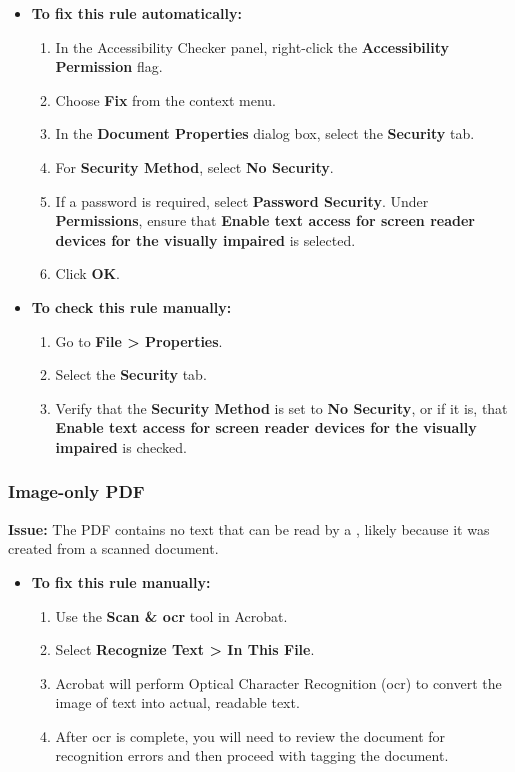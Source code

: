 \begin{itemize}
	\item \textbf{To fix this rule automatically:}
	      \begin{enumerate}
		      \item In the Accessibility Checker panel, right-click the \textbf{Accessibility Permission} flag.
		      \item Choose \textbf{Fix} from the context menu.
		      \item In the \textbf{Document Properties} dialog box, select the \textbf{Security} tab.
		      \item For \textbf{Security Method}, select \textbf{No Security}.
		      \item If a password is required, select \textbf{Password Security}. Under \textbf{Permissions}, ensure that \textbf{Enable text access for screen reader devices for the visually impaired} is selected.
		      \item Click \textbf{OK}.
	      \end{enumerate}
	\item \textbf{To check this rule manually:}
	      \begin{enumerate}
		      \item Go to \textbf{File > Properties}.
		      \item Select the \textbf{Security} tab.
		      \item Verify that the \textbf{Security Method} is set to \textbf{No Security}, or if it is, that \textbf{Enable text access for screen reader devices for the visually impaired} is checked.
	      \end{enumerate}
\end{itemize}

\subsubsection{Image-only PDF}
\label{ssubsec:pdf-image-only}

\textbf{Issue:} The PDF contains no text that can be read by a , likely because it was created from a scanned document.

\begin{itemize}
	\item \textbf{To fix this rule manually:}
	      \begin{enumerate}
		      \item Use the \textbf{Scan \& \gls{ocr}} tool in Acrobat.
		      \item Select \textbf{Recognize Text > In This File}.
		      \item Acrobat will perform Optical Character Recognition (\gls{ocr}) to convert the image of text into actual, readable text.
		      \item After \gls{ocr} is complete, you will need to review the document for recognition errors and then proceed with tagging the document.
	      \end{enumerate}
\end{itemize}

